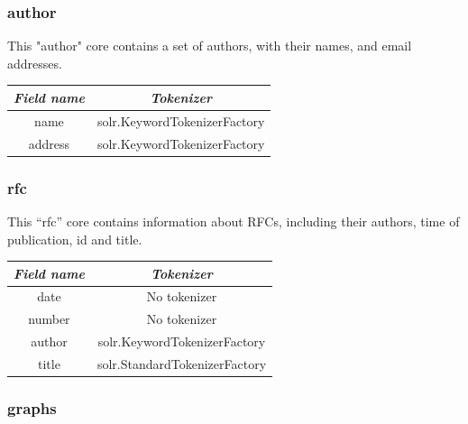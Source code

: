 \documentclass[a4paper,english]{report}
\begin{document}
\subsubsection{author}

This "author" core contains a set of authors, with their names, and email addresses.


\begin{center}
 \begin{tabular}{||c | c||} 
 \hline
 \textit{Field name} & \textit{Tokenizer} \\ [1ex] 
 \hline\hline


name & solr.KeywordTokenizerFactory\\

\hline

address & solr.KeywordTokenizerFactory\\

\hline


\end{tabular}
\end{center}

\subsubsection{rfc}
This “rfc” core contains information about RFCs, including their authors, time of publication, id and title.

\begin{center}
 \begin{tabular}{||c | c||} 
 \hline
 \textit{Field name} & \textit{Tokenizer} \\ [1ex] 
 \hline\hline


date & No tokenizer\\

\hline


number & No tokenizer\\

\hline


author & solr.KeywordTokenizerFactory\\

\hline



title & solr.StandardTokenizerFactory\\

\hline


\end{tabular}
\end{center}


\subsubsection{graphs}
\end{document}

